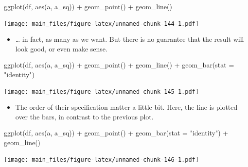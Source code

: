 \documentclass[
]{book}
\newenvironment{Shaded}{\begin{snugshade}}{\end{snugshade}}
\newcommand{\AttributeTok}[1]{\textcolor[rgb]{0.77,0.63,0.00}{#1}}
\newcommand{\FunctionTok}[1]{\textcolor[rgb]{0.00,0.00,0.00}{#1}}
\newcommand{\NormalTok}[1]{#1}
\newcommand{\SpecialCharTok}[1]{\textcolor[rgb]{0.00,0.00,0.00}{#1}}
\newcommand{\StringTok}[1]{\textcolor[rgb]{0.31,0.60,0.02}{#1}}
\providecommand{\tightlist}{%
  \setlength{\itemsep}{0pt}\setlength{\parskip}{0pt}}
\begin{document}
\begin{Shaded}
\begin{Highlighting}[]
\FunctionTok{ggplot}\NormalTok{(df, }\FunctionTok{aes}\NormalTok{(a, a\_sq)) }\SpecialCharTok{+} \FunctionTok{geom\_point}\NormalTok{() }\SpecialCharTok{+} \FunctionTok{geom\_line}\NormalTok{()}
\end{Highlighting}
\end{Shaded}

\texttt{[image: main\_files/figure-latex/unnamed-chunk-144-1.pdf]}

\begin{itemize}
\tightlist
\item
  \ldots{} in fact, as many as we want. But there is no guarantee that the result will look good, or even make sense.
\end{itemize}

\begin{Shaded}
\begin{Highlighting}[]
\FunctionTok{ggplot}\NormalTok{(df, }\FunctionTok{aes}\NormalTok{(a, a\_sq)) }\SpecialCharTok{+} \FunctionTok{geom\_point}\NormalTok{() }\SpecialCharTok{+} \FunctionTok{geom\_line}\NormalTok{() }\SpecialCharTok{+} \FunctionTok{geom\_bar}\NormalTok{(}\AttributeTok{stat =} \StringTok{"identity"}\NormalTok{)}
\end{Highlighting}
\end{Shaded}

\texttt{[image: main\_files/figure-latex/unnamed-chunk-145-1.pdf]}

\begin{itemize}
\tightlist
\item
  The order of their specification matter a little bit. Here, the line is plotted over the bars, in contrast to the previous plot.
\end{itemize}

\begin{Shaded}
\begin{Highlighting}[]
\FunctionTok{ggplot}\NormalTok{(df, }\FunctionTok{aes}\NormalTok{(a, a\_sq)) }\SpecialCharTok{+} \FunctionTok{geom\_point}\NormalTok{() }\SpecialCharTok{+} \FunctionTok{geom\_bar}\NormalTok{(}\AttributeTok{stat =} \StringTok{"identity"}\NormalTok{) }\SpecialCharTok{+} \FunctionTok{geom\_line}\NormalTok{()}
\end{Highlighting}
\end{Shaded}

\texttt{[image: main\_files/figure-latex/unnamed-chunk-146-1.pdf]}
\end{document}
